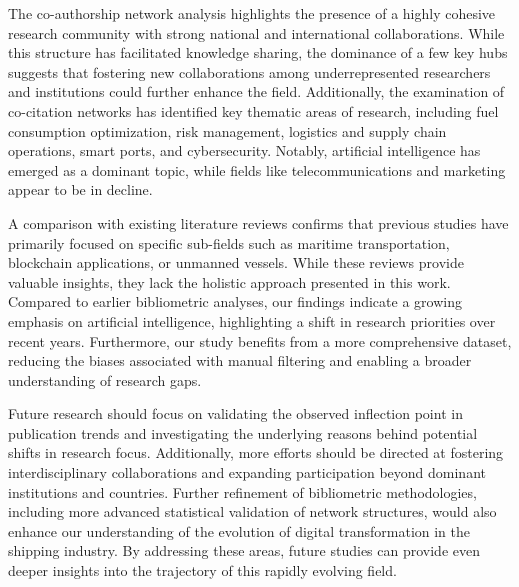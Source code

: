 \documentclass[jmse,review,submit,pdftex,moreauthors]{Definitions/mdpi}
\begin{document}
The co-authorship network analysis highlights the presence of a highly cohesive research community with strong national and international collaborations. While this structure has facilitated knowledge sharing, the dominance of a few key hubs suggests that fostering new collaborations among underrepresented researchers and institutions could further enhance the field. Additionally, the examination of co-citation networks has identified key thematic areas of research, including fuel consumption optimization, risk management, logistics and supply chain operations, smart ports, and cybersecurity. Notably, artificial intelligence has emerged as a dominant topic, while fields like telecommunications and marketing appear to be in decline.

A comparison with existing literature reviews confirms that previous studies have primarily focused on specific sub-fields such as maritime transportation, blockchain applications, or unmanned vessels. While these reviews provide valuable insights, they lack the holistic approach presented in this work. Compared to earlier bibliometric analyses, our findings indicate a growing emphasis on artificial intelligence, highlighting a shift in research priorities over recent years. Furthermore, our study benefits from a more comprehensive dataset, reducing the biases associated with manual filtering and enabling a broader understanding of research gaps.

Future research should focus on validating the observed inflection point in publication trends and investigating the underlying reasons behind potential shifts in research focus. Additionally, more efforts should be directed at fostering interdisciplinary collaborations and expanding participation beyond dominant institutions and countries. Further refinement of bibliometric methodologies, including more advanced statistical validation of network structures, would also enhance our understanding of the evolution of digital transformation in the shipping industry. By addressing these areas, future studies can provide even deeper insights into the trajectory of this rapidly evolving field.



\end{document}
